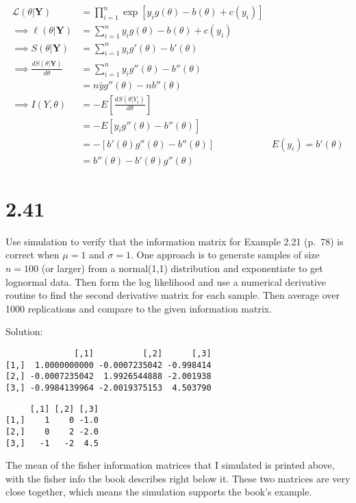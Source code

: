 \documentclass[
  letterpaper,
  DIV=11,
  numbers=noendperiod]{scrreprt}
\begin{document}
\[
\begin{aligned}
\mathcal L(\theta|\mathbf Y) &= \prod_{i=1}^n \exp[y_ig(\theta)-b(\theta)+c(y_i)] \\
\implies \ell (\theta | \mathbf Y) &= \sum_{i=1}^n y_i g(\theta)-b(\theta)+c(y_i) \\
\implies S (\theta | \mathbf Y) &= \sum_{i=1}^n y_ig'(\theta) -b'(\theta)\\
\implies \frac{d S (\theta | \mathbf Y)}{d \theta} &= \sum_{i=1}^n y_ig''(\theta) -b''(\theta) \\
&= n \bar y g''(\theta) -nb''(\theta) \\
\implies I(Y,\theta) &= - E \left[\frac{d S (\theta | Y_i)}{d \theta}\right] \\
&= -E\left[y_ig''(\theta) -b''(\theta)\right] \\
&= - \left[b'(\theta) g''(\theta) -b''(\theta)\right] & E(y_i) = b'(\theta) \\
&= b''(\theta) - b'(\theta) g'' (\theta) 
\end{aligned}
\]

\newpage

\hypertarget{section-13}{%
\section{2.41}\label{section-13}}

Use simulation to verify that the information matrix for Example 2.21
(p.~78) is correct when \(\mu =1\) and \(\sigma =1\). One approach is to
generate samples of size \(n=100\) (or larger) from a normal(1,1)
distribution and exponentiate to get lognormal data. Then form the log
likelihood and use a numerical derivative routine to find the second
derivative matrix for each sample. Then average over 1000 replications
and compare to the given information matrix.

Solution:

\begin{verbatim}
              [,1]          [,2]      [,3]
[1,]  1.0000000000 -0.0007235042 -0.998414
[2,] -0.0007235042  1.9926544888 -2.001938
[3,] -0.9984139964 -2.0019375153  4.503790
\end{verbatim}

\begin{verbatim}
     [,1] [,2] [,3]
[1,]    1    0 -1.0
[2,]    0    2 -2.0
[3,]   -1   -2  4.5
\end{verbatim}

The mean of the fisher information matrices that I simulated is printed
above, with the fisher info the book describes right below it. These two
matrices are very close together, which means the simulation supports
the book's example.
\end{document}
